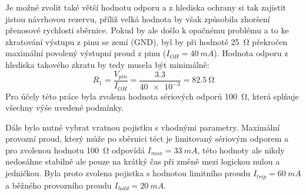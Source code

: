             Je možné zvolit také větší hodnotu odporu a z hlediska ochrany si tak zajistit jistou návrhovou rezervu, příliž velká hodnota by však způsobila zhoršení přenosové rychlosti sběrnice. Pokud by ale došlo k opačnému problému a to ke zkratování výstupu z pinu se zemí (GND), byl by při hodnotě \qty{25}{\ohm} překročen maximální povolený výstupní proud z pinu (\(I_{OH}=\qty{40}{mA}\)). Hodnota odporu z hlediska takového zkratu by tedy musela být minimálně:
            \begin{equation}
                R_{1} =\frac{V_{pin}}{I_{OH} }=\frac{\num{3.3}}{\num{40e-3}}=\qty{82.5}{\ohm}
            \end{equation}
            Pro účely této práce byla zvolena hodnota sériových odporů \qty{100}{\ohm}, která splňuje všechny výše uvedené podmínky.

            Dále bylo nutné vybrat vratnou pojistku s vhodnými parametry. Maximální provozní proud, který může po sběrnici téct je limitovaný sériovým odporem a pro zvolenou hodnotu \qty{100}{\ohm} odpovídá \(I_{max} =\qty{33}{mA}\), této hodnoty ale nikdy nedosáhne stabilně ale pouze na krátký čas při změně mezi logickou nulou a jedničkou. Byla proto zvolena pojistka s hodnotou limitního proudu \(I_{trip} =\qty{60}{mA}\) a běžného provozního proudu \(I_{hold} =\qty{20}{mA}\). 

            

            